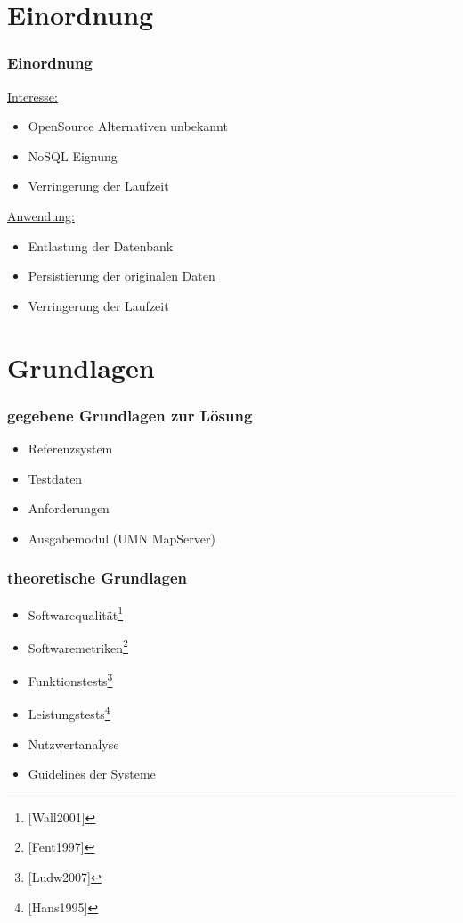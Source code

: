 \documentclass{beamer}
\begin{document}
\section{Einordnung}
\begin{frame}\frametitle{Einordnung} 
\underline{Interesse:}\\
\begin{itemize}
\item OpenSource Alternativen unbekannt
\item NoSQL Eignung
\item Verringerung der Laufzeit
\end{itemize}

\underline{Anwendung:}\\
\begin{itemize}
\item Entlastung der Datenbank
\item Persistierung der originalen Daten
\item Verringerung der Laufzeit
\end{itemize}
\end{frame}

\section{Grundlagen}
\begin{frame}\frametitle{gegebene Grundlagen zur Lösung} 
\begin{itemize}
\item Referenzsystem %
\item Testdaten
\item Anforderungen
\item Ausgabemodul (UMN MapServer)
\end{itemize}
\end{frame}

\begin{frame}\frametitle{theoretische Grundlagen} 
\begin{itemize}
\item Softwarequalität\footnote{[Wall2001]}
\item Softwaremetriken\footnote{[Fent1997]}
\item Funktionstests\footnote{[Ludw2007]}
\item Leistungstests\footnote{[Hans1995]}
\item Nutzwertanalyse
%
\item Guidelines der Systeme
\end{itemize}
\end{frame}
\end{document}
